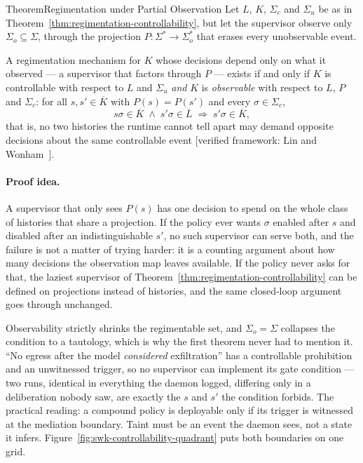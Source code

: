 \documentclass[11pt,a4paper]{article}
\theoremstyle{definition}
\theoremstyle{remark}
\begin{document}
\begin{pdclaim}{Theorem}{Regimentation under Partial Observation}\label{thm:observability-regimentation}
\setlength{\parskip}{4pt plus 1pt}
Let $L$, $K$, $\Sigma_c$ and $\Sigma_u$ be as in
Theorem~\ref{thm:regimentation-controllability}, but let the supervisor observe only
$\Sigma_o \subseteq \Sigma$, through the projection $P : \Sigma^{*} \to \Sigma_o^{*}$ that
erases every unobservable event.

A regimentation mechanism for $K$ whose decisions depend
only on what it observed --- a supervisor that factors through $P$ --- exists if and only if
$K$ is controllable with respect to $L$ and $\Sigma_u$ \emph{and} $K$ is
\emph{observable} with respect to $L$, $P$ and $\Sigma_c$: for all $s, s' \in \overline{K}$
with $P(s) = P(s')$ and every $\sigma \in \Sigma_c$,
\[
  s\sigma \in \overline{K} \;\wedge\; s'\sigma \in \overline{L}
  \;\Longrightarrow\; s'\sigma \in \overline{K},
\]
that is, no two histories the runtime cannot tell apart may demand opposite decisions about
the same controllable event
[verified framework: Lin and Wonham~].
\end{pdclaim}

\paragraph{Proof idea.}
A supervisor that only sees $P(s)$ has one decision to spend on the whole class of histories
that share a projection. If the policy ever wants $\sigma$ enabled after $s$ and disabled
after an indistinguishable $s'$, no such supervisor can serve both, and the failure is not a
matter of trying harder: it is a counting argument about how many decisions the observation
map leaves available. If the policy never asks for that, the laziest supervisor of
Theorem~\ref{thm:regimentation-controllability} can be defined on projections instead of
histories, and the same closed-loop argument goes through unchanged.

Observability strictly shrinks the regimentable set, and $\Sigma_o = \Sigma$ collapses the
condition to a tautology, which is why the first theorem never had to mention it.
``No egress after the model \emph{considered} exfiltration'' has a
controllable prohibition and an unwitnessed trigger, so no supervisor can implement its gate
condition --- two runs, identical in everything the daemon logged, differing only in a
deliberation nobody saw, are exactly the $s$ and $s'$ the condition forbids. The practical
reading: a compound policy is deployable only if its trigger is
witnessed at the mediation boundary. Taint must be an event the daemon sees, not a state it
infers. Figure~\ref{fig:swk-controllability-quadrant} puts both boundaries on one grid.
\end{document}
